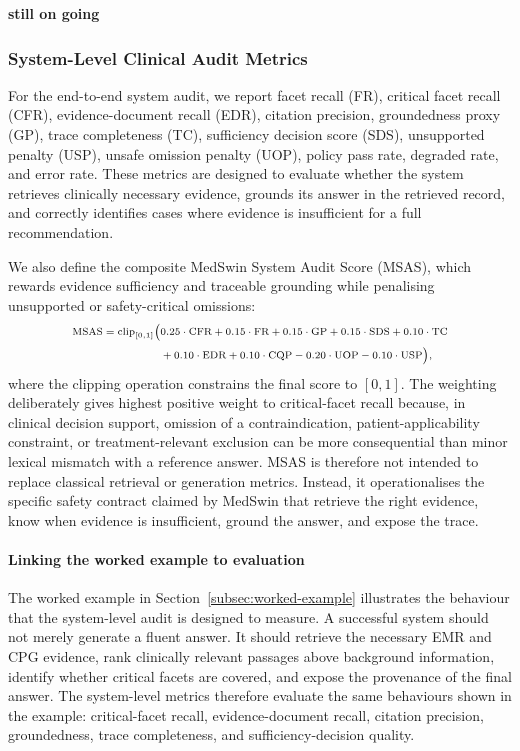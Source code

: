 \documentclass[conference]{IEEEtran}
\begin{document}
\textbf{still on going}

\subsubsection{System-Level Clinical Audit Metrics}
For the end-to-end system audit, we report facet recall (FR), critical facet recall (CFR), evidence-document recall (EDR), citation precision, groundedness proxy (GP), trace completeness (TC), sufficiency decision score (SDS), unsupported penalty (USP), unsafe omission penalty (UOP), policy pass rate, degraded rate, and error rate. These metrics are designed to evaluate whether the system retrieves clinically necessary evidence, grounds its answer in the retrieved record, and correctly identifies cases where evidence is insufficient for a full recommendation.

We also define the composite MedSwin System Audit Score (MSAS), which rewards evidence sufficiency and traceable grounding while penalising unsupported or safety-critical omissions:
\begin{equation}
\label{eq:msas}
\scriptsize
\begin{aligned}
\text{MSAS} = \mathrm{clip}_{[0,1]}\Big(&
0.25 \cdot \text{CFR}
+0.15 \cdot \text{FR}
+0.15 \cdot \text{GP}
+0.15 \cdot \text{SDS}
+0.10 \cdot \text{TC}
\\
&+0.10 \cdot \text{EDR}
+0.10 \cdot \text{CQP}
-0.20 \cdot \text{UOP}
-0.10 \cdot \text{USP}
\Big),
\end{aligned}
\end{equation}
where the clipping operation constrains the final score to $[0,1]$. The weighting deliberately gives highest positive weight to critical-facet recall because, in clinical decision support, omission of a contraindication, patient-applicability constraint, or treatment-relevant exclusion can be more consequential than minor lexical mismatch with a reference answer. MSAS is therefore not intended to replace classical retrieval or generation metrics. Instead, it operationalises the specific safety contract claimed by MedSwin that retrieve the right evidence, know when evidence is insufficient, ground the answer, and expose the trace.


\paragraph{Linking the worked example to evaluation}
The worked example in Section~\ref{subsec:worked-example} illustrates the behaviour that the system-level audit is designed to measure. A successful system should not merely generate a fluent answer. It should retrieve the necessary EMR and CPG evidence, rank clinically relevant passages above background information, identify whether critical facets are covered, and expose the provenance of the final answer. The system-level metrics therefore evaluate the same behaviours shown in the example: critical-facet recall, evidence-document recall, citation precision, groundedness, trace completeness, and sufficiency-decision quality.
\end{document}
